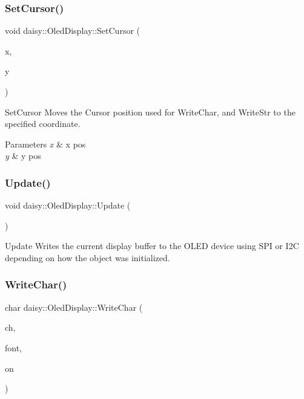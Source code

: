 \subsubsection{\texorpdfstring{Set\+Cursor()}{SetCursor()}}
{\footnotesize\ttfamily void daisy\+::\+Oled\+Display\+::\+Set\+Cursor (\begin{DoxyParamCaption}\item[{uint8\+\_\+t}]{x,  }\item[{uint8\+\_\+t}]{y }\end{DoxyParamCaption})}

Set\+Cursor Moves the \textquotesingle{}Cursor\textquotesingle{} position used for Write\+Char, and Write\+Str to the specified coordinate. 
\begin{DoxyParams}{Parameters}
{\em x} & x pos \\
\hline
{\em y} & y pos \\
\hline
\end{DoxyParams}
\mbox{\label{classdaisy_1_1_oled_display_a41b556a03d7b340a7d64cc09600b6ddf}} 
\subsubsection{\texorpdfstring{Update()}{Update()}}
{\footnotesize\ttfamily void daisy\+::\+Oled\+Display\+::\+Update (\begin{DoxyParamCaption}{ }\end{DoxyParamCaption})}

Update Writes the current display buffer to the O\+L\+ED device using S\+PI or I2C depending on how the object was initialized. \mbox{\label{classdaisy_1_1_oled_display_aeca27f2d60a0aeff4b79b88977d20779}} 
\subsubsection{\texorpdfstring{Write\+Char()}{WriteChar()}}
{\footnotesize\ttfamily char daisy\+::\+Oled\+Display\+::\+Write\+Char (\begin{DoxyParamCaption}\item[{char}]{ch,  }\item[{\hyperlink{struct_font_def}{Font\+Def}}]{font,  }\item[{bool}]{on }\end{DoxyParamCaption})}

